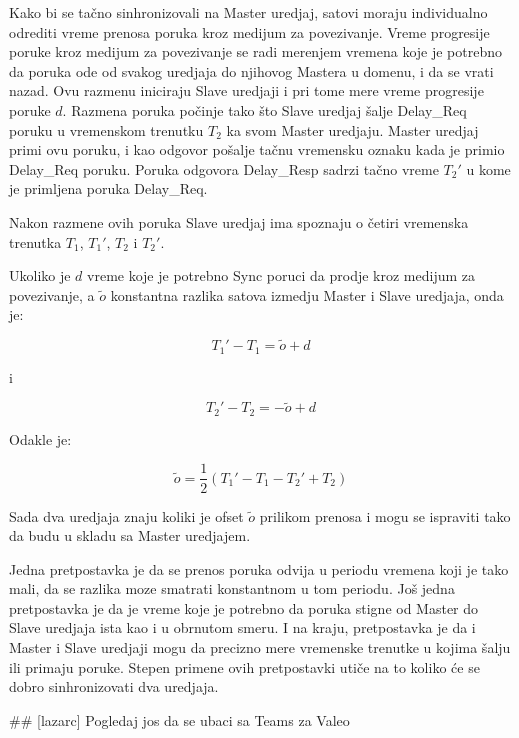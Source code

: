 \documentclass[a4paper,12pt, master]{etf}
\begin{document}
	Kako bi se ta\v{c}no sinhronizovali na Master uredjaj, satovi moraju
	individualno odrediti vreme prenosa poruka kroz medijum za povezivanje.
	Vreme progresije poruke kroz medijum za	povezivanje	se radi merenjem
	vremena koje je potrebno da poruka ode od svakog uredjaja do njihovog
	Mastera u domenu, i da se vrati nazad. Ovu razmenu iniciraju Slave uredjaji
	i pri tome mere vreme progresije poruke $d$. Razmena poruka po\v{c}inje
	tako \v{s}to Slave uredjaj \v{s}alje Delay\_Req poruku u vremenskom
	trenutku $T_2$ ka svom Master uredjaju. Master uredjaj primi ovu poruku, i
	kao	odgovor po\v{s}alje ta\v{c}nu vremensku oznaku kada je primio Delay\_Req
	poruku. Poruka odgovora	Delay\_Resp sadrzi ta\v{c}no vreme $T_2'$ u kome je
	primljena poruka Delay\_Req.

	Nakon razmene ovih poruka Slave uredjaj ima spoznaju o \v{c}etiri vremenska
	trenutka $T_1$,	$T_1'$,	$T_2$ i $T_2'$.

	Ukoliko je $d$ vreme koje je potrebno Sync poruci da prodje kroz medijum za
	povezivanje, a $\tilde{o}$ konstantna razlika satova izmedju Master i Slave
	uredjaja, onda je:

	\begin{equation}
		T_1' - T_1 = \tilde{o} + d
	\end{equation}

	i

	\begin{equation}
			T_2' - T_2 = -\tilde{o} + d
	\end{equation}

	Odakle je:

	\begin{equation}
		\tilde{o} = \frac{1}{2} (T_1' - T_1 - T_2' + T_2)
	\end{equation}

	Sada dva uredjaja znaju koliki je ofset $\tilde{o}$ prilikom prenosa i mogu
	se ispraviti tako da budu u skladu sa Master uredjajem.

	Jedna pretpostavka je da se prenos poruka odvija u periodu vremena koji je
	tako mali, da se razlika moze smatrati konstantnom u tom periodu. Jo\v{s}
	jedna pretpostavka je da je vreme koje je potrebno da poruka stigne od
	Master do Slave uredjaja ista kao i u obrnutom smeru. I na kraju,
	pretpostavka je da i Master i Slave uredjaji mogu da precizno mere
	vremenske trenutke u kojima \v{s}alju ili primaju poruke. Stepen primene
	ovih pretpostavki uti\v{c}e na to koliko \'{c}e se dobro sinhronizovati dva
	uredjaja.

	\#\# [lazarc] Pogledaj jos da se ubaci sa Teams za Valeo
\end{document}
